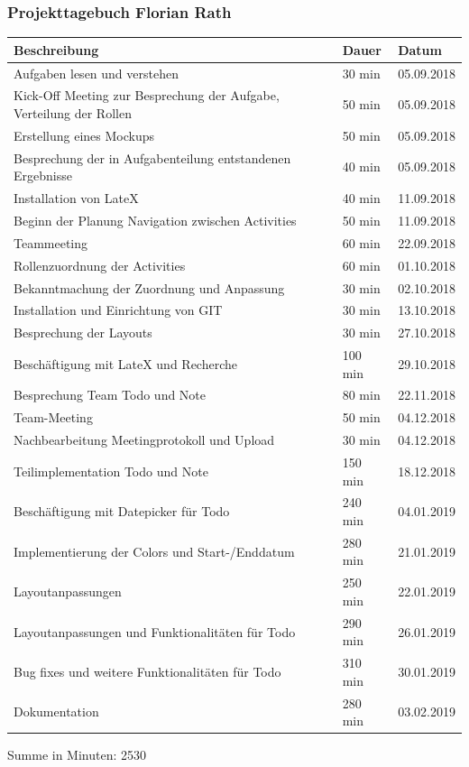 \subsubsection{Projekttagebuch Florian Rath}
\begin{longtable}{|p{10cm}|p{2cm}|p{2cm}|}
\hline
{\textbf{Beschreibung}} & {\textbf{Dauer}} & {\textbf{Datum}} \\ \hline
Aufgaben lesen und verstehen & 30 min & 05.09.2018\\ \hline 
Kick-Off Meeting zur Besprechung der Aufgabe, Verteilung der Rollen & 50 min & 05.09.2018\\ \hline 
Erstellung eines Mockups & 50 min & 05.09.2018\\ \hline 
Besprechung der in Aufgabenteilung entstandenen Ergebnisse & 40 min & 05.09.2018\\ \hline 
Installation von LateX & 40 min & 11.09.2018\\ \hline 
Beginn der Planung Navigation zwischen Activities & 50 min & 11.09.2018\\ \hline 
Teammeeting & 60 min & 22.09.2018\\ \hline 
Rollenzuordnung der Activities & 60 min & 01.10.2018\\ \hline 
Bekanntmachung der Zuordnung und Anpassung & 30 min & 02.10.2018\\ \hline 
Installation und Einrichtung von GIT & 30 min & 13.10.2018\\ \hline 
Besprechung der Layouts & 30 min & 27.10.2018\\ \hline 
Beschäftigung mit LateX und Recherche & 100 min & 29.10.2018\\ \hline 
Besprechung Team Todo und Note & 80 min & 22.11.2018\\ \hline 
Team-Meeting & 50 min & 04.12.2018\\ \hline 
Nachbearbeitung Meetingprotokoll und Upload & 30 min & 04.12.2018\\ \hline 
Teilimplementation Todo und Note & 150 min & 18.12.2018\\ \hline 
Beschäftigung mit Datepicker für Todo & 240 min & 04.01.2019\\ \hline 
Implementierung der Colors und Start-/Enddatum & 280 min & 21.01.2019\\ \hline 
Layoutanpassungen & 250 min & 22.01.2019\\ \hline 
Layoutanpassungen und Funktionalitäten für Todo & 290 min & 26.01.2019\\ \hline 
Bug fixes und weitere Funktionalitäten für Todo & 310 min & 30.01.2019\\ \hline 
Dokumentation & 280 min & 03.02.2019\\ \hline 
\end{longtable}
Summe in Minuten: 2530

